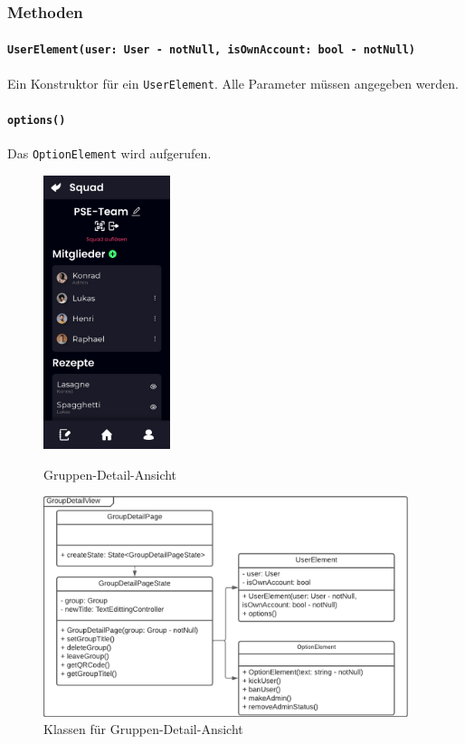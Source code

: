 \documentclass{entwurfsheft}
\begin{document}
        \subsubsection*{Methoden}
            \paragraph*{\texttt{UserElement(user: User - notNull, isOwnAccount: bool - notNull)}} Ein Konstruktor für ein \texttt{UserElement}. Alle Parameter müssen angegeben werden.
            \paragraph*{\texttt{options()}} Das \texttt{OptionElement} wird aufgerufen.

        \begin{figure}[htp]
            \begin{minipage}
                [t]{0.49\textwidth}
                \centering
                \includegraphics[height=80mm]{images/Presentation-layer/GroupDetailView.jpg}
                \caption{Gruppen-Detail-Ansicht}
            \end{minipage}
            \begin{minipage}
                [t]{0.49\textwidth}
                \centering
                \includegraphics[width=0.95\textwidth]{images/Presentation-layer/GroupDetailViewClass.pdf}
                \caption{Klassen für Gruppen-Detail-Ansicht}
            \end{minipage}
        \end{figure} 
\end{document}
